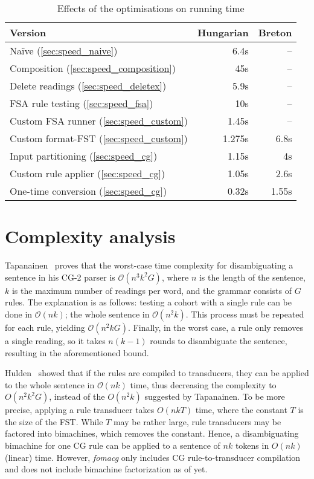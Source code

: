 \documentclass[11pt]{article}
\begin{document}
\begin{table}[h]
  \centering
  \caption{Effects of the optimisations on running time}
  \label{tab:evaluation}
  \begin{tabular}{ | l | r | r | }
  \hline
  \textbf{Version} & \textbf{Hungarian} & \textbf{Breton} \\
  \hline
  Naïve (\ref{sec:speed_naive})                 & 6.4s   & -- \\
  Composition (\ref{sec:speed_composition})     & 45s    & -- \\
  Delete readings (\ref{sec:speed_deletex})     & 5.9s   & -- \\
  FSA rule testing (\ref{sec:speed_fsa})        & 10s    & -- \\
  Custom FSA runner (\ref{sec:speed_custom})    & 1.45s  & -- \\
  Custom format-FST (\ref{sec:speed_custom})    & 1.275s & 6.8s \\
  Input partitioning (\ref{sec:speed_cg})       & 1.15s  & 4s \\
  Custom rule applier (\ref{sec:speed_cg})      & 1.05s  & 2.6s \\
  One-time conversion (\ref{sec:speed_cg})      & 0.32s  & 1.55s \\
  \hline
  \end{tabular}
\end{table}

\section{Complexity analysis}
\label{sec:complex}

Tapanainen~ proves that the worst-case time complexity
for disambiguating a sentence in his CG-2 parser is $\mathcal{O}(n^3k^2G)$,
where $n$ is the length of the sentence, $k$ is the maximum number of readings
per word, and the grammar consists of $G$ rules. The explanation is as follows:
testing a cohort with a single rule can be done in $\mathcal{O}(nk)$; 
the whole sentence in $\mathcal{O}(n^2k)$. This process must be repeated for
each rule, yielding $\mathcal{O}(n^2kG)$. Finally, in the worst case, a rule
only removes a single reading, so it takes $n(k - 1)$ rounds to disambiguate the
sentence, resulting in the aforementioned bound.

Hulden~ showed that if the rules are compiled to
transducers, they can be applied to the whole sentence in $\mathcal{O}(nk)$
time, thus decreasing the complexity to $O(n^{2}k^{2}G)$, instead of the
$O(n^{2}k)$ suggested by Tapanainen. To be more precise, applying a rule
transducer takes $O(nkT)$ time, where the constant $T$ is the size of the FST.
While $T$ may be rather large, rule transducers may be factored into
bimachines, which removes the constant. Hence, a disambiguating bimachine for
one CG rule can be applied to a sentence of $nk$ tokens in $O(nk)$
(linear) time. However, \textit{fomacg} only includes CG
rule-to-transducer compilation and does not include bimachine
factorization as of yet.
\end{document}
